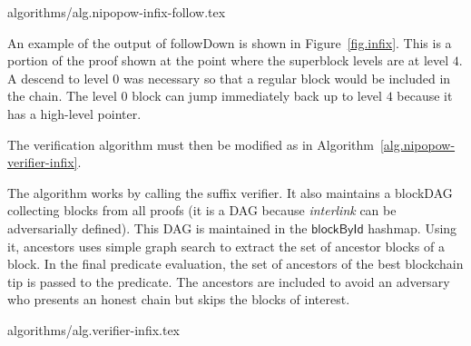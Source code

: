 {algorithms/alg.nipopow-infix-follow.tex}

An example of the output of followDown is shown in Figure~\ref{fig.infix}. This
is a portion of the proof shown at the point where the superblock levels are at
level $4$. A descend to level $0$ was necessary so that a regular block would be
included in the chain. The level $0$ block can jump immediately back up to level
$4$ because it has a high-level pointer.

The verification algorithm must then be modified as in
Algorithm~\ref{alg.nipopow-verifier-infix}.

The algorithm works by calling the suffix verifier. It also maintains a blockDAG
collecting blocks from all proofs (it is a DAG because \textit{interlink} can be
adversarially defined). This DAG is maintained in the $\textsf{blockById}$
hashmap. Using it, \textsf{ancestors} uses simple graph search to extract the
set of ancestor blocks of a block. In the final predicate evaluation, the set of
ancestors of the best blockchain tip is passed to the predicate. The ancestors
are included to avoid an adversary who presents an honest chain but skips the
blocks of interest.

{algorithms/alg.verifier-infix.tex}
